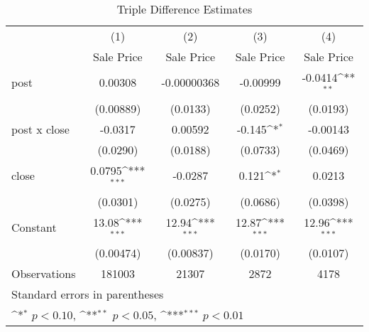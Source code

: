 \begin{table}[htbp]\centering
\def\sym#1{\ifmmode^{#1}\else\(^{#1}\)\fi}
\caption{Triple Difference Estimates\label{tabl}}
\begin{tabular}{l*{4}{c}}
\hline\hline
                    &\multicolumn{1}{c}{(1)}&\multicolumn{1}{c}{(2)}&\multicolumn{1}{c}{(3)}&\multicolumn{1}{c}{(4)}\\
                    &\multicolumn{1}{c}{Sale Price}&\multicolumn{1}{c}{Sale Price}&\multicolumn{1}{c}{Sale Price}&\multicolumn{1}{c}{Sale Price}\\
\hline
post                &     0.00308         & -0.00000368         &    -0.00999         &     -0.0414\sym{**} \\
                    &   (0.00889)         &    (0.0133)         &    (0.0252)         &    (0.0193)         \\
[1em]
post x close        &     -0.0317         &     0.00592         &      -0.145\sym{*}  &    -0.00143         \\
                    &    (0.0290)         &    (0.0188)         &    (0.0733)         &    (0.0469)         \\
[1em]
close               &      0.0795\sym{***}&     -0.0287         &       0.121\sym{*}  &      0.0213         \\
                    &    (0.0301)         &    (0.0275)         &    (0.0686)         &    (0.0398)         \\
[1em]
Constant            &       13.08\sym{***}&       12.94\sym{***}&       12.87\sym{***}&       12.96\sym{***}\\
                    &   (0.00474)         &   (0.00837)         &    (0.0170)         &    (0.0107)         \\
\hline
Observations        &      181003         &       21307         &        2872         &        4178         \\
\hline\hline
\multicolumn{5}{l}{\footnotesize Standard errors in parentheses}\\
\multicolumn{5}{l}{\footnotesize \sym{*} \(p<0.10\), \sym{**} \(p<0.05\), \sym{***} \(p<0.01\)}\\
\end{tabular}
\end{table}
